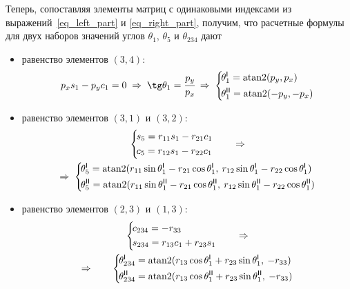 Теперь, сопоставляя элементы матриц с одинаковыми индексами из выражений~\eqref{eq_left_part} и \eqref{eq_right_part}, получим, что расчетные формулы для двух наборов значений углов $\theta_1$, $\theta_5$ и $\theta_{234}$ дают
\begin{itemize}
    \item равенство элементов $(3,4)$:
        \begin{equation}\label{eq_for_theta_1}
	        p_{x} s_{1} - p_{y} c_{1} = 0
            \; \Rightarrow \;
	        \tg \theta_1 = \cfrac{p_y}{p_x}
	        \; \Rightarrow \;
	        \left\{
	        \begin{aligned}
		        \!&\theta_1^\msf{I} = \atan2(p_y, p_x)\\
		        \!&\theta_1^\msf{II} = \atan2(-p_y, -p_x)
            \end{aligned}
            \right.
        \end{equation}
    \item равенство элементов $(3,1)$ и $(3,2)$:
        \begin{multline}
            \left\{
	        \begin{aligned}
		        \!&s_{5} = r_{11} s_{1} - r_{21} c_{1}\\
		        \!&c_{5} = r_{12} s_{1} - r_{22} c_{1}
            \end{aligned}
            \right.
            \qquad \Rightarrow
            \\
            \Rightarrow \;
            \left\{
	        \begin{aligned}
		        \!&\theta_5^\msf{I} = \atan2(r_{11} \sin\theta_1^\msf{I} - r_{21} \cos\theta_1^\msf{I},\: r_{12} \sin\theta_1^\msf{I} - r_{22} \cos\theta_1^\msf{I})\\
		        \!&\theta_5^\msf{II} = \atan2(r_{11} \sin\theta_1^\msf{II} - r_{21} \cos\theta_1^\msf{II},\: r_{12} \sin\theta_1^\msf{II} - r_{22} \cos\theta_1^\msf{II})
            \end{aligned}
            \right.
        \end{multline}
    \item равенство элементов $(2,3)$ и $(1,3)$:
        \begin{multline}
            \left\{
	        \begin{aligned}
		        \!&c_{234} = -r_{33}\\
		        \!&s_{234} = r_{13} c_{1} + r_{23} s_{1}
            \end{aligned}
            \right.
            \qquad \Rightarrow
            \\
            \Rightarrow \qquad
            \left\{
	        \begin{aligned}
		        \!&\theta_{234}^\msf{I} = \atan2(r_{13} \cos\theta_1^\msf{I}  + r_{23} \sin\theta_1^\msf{I},\: -r_{33})\\
		        \!&\theta_{234}^\msf{II} = \atan2(r_{13} \cos\theta_1^\msf{II}  + r_{23} \sin\theta_1^\msf{II},\: -r_{33})
            \end{aligned}
            \right.
        \end{multline}
\end{itemize}

